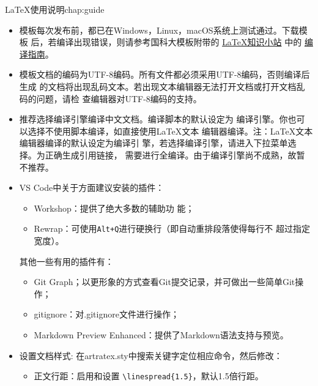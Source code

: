 \begin{cuzchapter}{\LaTeX{}使用说明}{chap:guide}
    \begin{itemize}
        \item 模板每次发布前，都已在Windows，Linux，macOS系统上测试通过。下载模板
              后，若编译出现错误，则请参考国科大模板附带的
              \href{https://github.com/mohuangrui/ucasthesis/wiki}{\LaTeX{}知识小站} 中的
              \href{https://github.com/mohuangrui/ucasthesis/wiki/%E7%BC%96%E8%AF%91%E6%8C%87%E5%8D%97}{编
                  译指南}。
        \item 模板文档的编码为UTF-8编码。所有文件都必须采用UTF-8编码，否则编译后生成
              的文档将出现乱码文本。若出现文本编辑器无法打开文档或打开文档乱码的问题，请检
              查编辑器对UTF-8编码的支持。
        \item 推荐选择编译引擎编译中文文档。编译脚本的默认设定为
              编译引擎。你也可以选择不使用脚本编译，如直接使用\LaTeX{}文本
              编辑器编译。注：\LaTeX{}文本编辑器编译的默认设定为编译引
              擎，若选择编译引擎，请进入下拉菜单选择。为正确生成引用链接，
              需要进行全编译。由于编译引擎尚不成熟，故暂不推荐。
        \item VS Code中关于方面建议安装的插件：
              \begin{itemize}
                  \item {} Workshop：提供了绝大多数的辅助功
                        能；
                  \item Rewrap：可使用\verb|Alt+Q|进行硬换行（即自动重排段落使得每行不
                        超过指定宽度）。
              \end{itemize}
              其他一些有用的插件有：
              \begin{itemize}
                  \item Git Graph；以更形象的方式查看Git提交记录，并可做出一些简单Git操作；
                  \item gitignore：对.gitignore文件进行操作；
                  \item Markdown Preview Enhanced：提供了Markdown语法支持与预览。
              \end{itemize}
        \item 设置文档样式: 在artratex.sty中搜索关键字定位相应命令，然后修改：
              \begin{itemize}
                  \item 正文行距：启用和设置 \verb|\linespread{1.5}|，默认1.5倍行距。

\end{itemize}
\end{itemize}
\end{cuzchapter}
